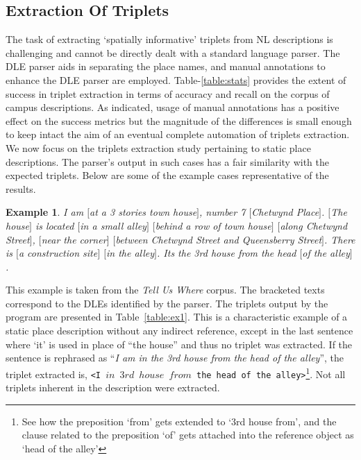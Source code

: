 \documentclass{sig-alternate}
\begin{document}
\subsection{Extraction Of Triplets}
\label{extraction}
The task of extracting `spatially informative' triplets from NL descriptions is challenging and cannot be directly dealt with a standard language parser. The DLE parser aids in separating the place names, and manual annotations to enhance the DLE parser are employed.
Table-\ref{table:stats} provides the extent of success in triplet extraction in terms of accuracy and recall on the corpus of campus descriptions. As indicated, usage of manual annotations has a positive effect on the success metrics but the magnitude of the differences is small enough to keep intact the aim of an eventual complete automation of triplets extraction. We now focus on the triplets extraction study pertaining to static place descriptions. The parser's output in such cases has a fair similarity with the expected triplets. 
Below are some of the example cases representative of the results. \vspace{-0.05in}
\newtheorem{example}{Example}
\begin{example}
\label{tuwex1}
I am $[$at a 3 stories town house$]$, number 7 $[$Chetwynd Place$]$. $[$The house$]$ is located $[$in a small alley$]$ $[$behind a row of town house$]$ $[$along Chetwynd Street$]$, $[$near the corner$]$ $[$between Chetwynd Street and Queensberry Street$]$. There is $[$a construction site$]$ $[$in the alley$]$. Its the 3rd house from the head $[$of the alley$]$ \vspace{-0.05in}.
\end{example}
This example is taken from the \textit{Tell Us Where} corpus. The bracketed texts correspond to the DLEs identified by the parser. The triplets output by the program are presented in Table~\ref{table:ex1}. This is a characteristic example of a static place description without any indirect reference, except in the last sentence where `it' is used in place of ``the house'' and thus no triplet was extracted. If the sentence is rephrased as ``\textit{I am in the 3rd house from the head of the alley}'', the triplet extracted is, \texttt{<I $in$ $3rd$ $house$ $from$ the head of the alley>}\footnote{See how the preposition `from' gets extended to `3rd house from', and the clause related to the preposition `of' gets attached into the reference object as `head of the alley'}. Not all triplets inherent in the description were extracted. 
\end{document}
